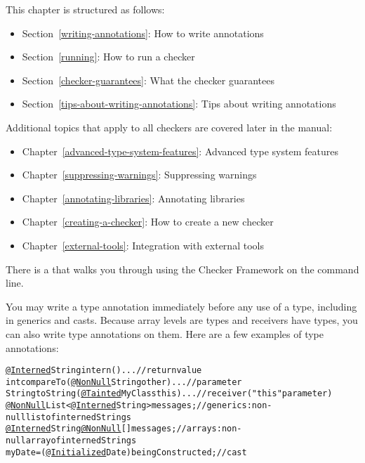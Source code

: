 This chapter is structured as follows:
\begin{itemize}
\item Section~\ref{writing-annotations}: How to write annotations
\item Section~\ref{running}:  How to run a checker
\item Section~\ref{checker-guarantees}: What the checker guarantees
\item Section~\ref{tips-about-writing-annotations}: Tips about writing annotations
\end{itemize}

Additional topics that apply to all checkers are covered later in the manual:
\begin{itemize}
\item Chapter~\ref{advanced-type-system-features}: Advanced type system features
\item Chapter~\ref{suppressing-warnings}: Suppressing warnings
\item Chapter~\ref{annotating-libraries}: Annotating libraries
\item Chapter~\ref{creating-a-checker}: How to create a new checker
\item Chapter~\ref{external-tools}: Integration with external tools
\end{itemize}


There is a
that walks you through using the Checker Framework on the
command line.




You may write a type annotation immediately before any
use of a type, including in generics and casts.  Because array levels are
types and receivers have types, you can also write type annotations on
them.  Here are a few examples of type annotations:

\begin{smaller}
\begin{alltt}
  \underline{@Interned} String intern() \ttlcb{} ... \ttrcb{}               // return value
  int compareTo(\underline{@NonNull} String other) \ttlcb{} ... \ttrcb{}    // parameter
  String toString(\underline{@Tainted} MyClass this) \ttlcb{} ... \ttrcb{}  // receiver ("this" parameter)
  \underline{@NonNull} List<\underline{@Interned} String> messages;       // generics:  non-null list of interned Strings
  \underline{@Interned} String \underline{@NonNull} [] messages;          // arrays:  non-null array of interned Strings
  myDate = (\underline{@Initialized} Date) beingConstructed;  // cast
\end{alltt}
\end{smaller}

